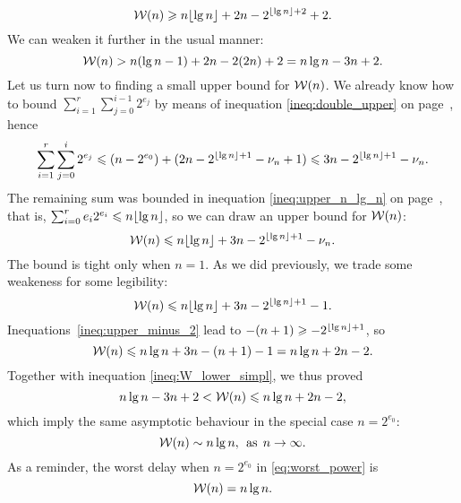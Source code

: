 \begin{equation}
\mathcal{W}(n) \geqslant n\lfloor{\lg n}\rfloor + 2n - 2^{\lfloor{\lg n}\rfloor+2} + 2.
\label{ineq:W_lower}
\end{equation}
We can weaken it further in the usual manner:
\begin{equation}
\mathcal{W}(n) > n(\lg n - 1) + 2n - 2(2n) + 2 = n\lg n - 3n + 2.
\label{ineq:W_lower_simpl}
\end{equation}
Let us turn now to finding a small upper bound for \(\mathcal{W}(n)\).  We
already know how to bound \(\sum_{i=1}^{r}\sum_{j=0}^{i-1}{2^{e_j}}\)
by means of inequation \eqref{ineq:double_upper}
on page~\pageref{ineq:double_upper}, hence
\begin{equation*}
\sum_{i=1}^{r}\sum_{j=0}^{i}{2^{e_j}}
\leqslant (n - 2^{e_0})
           + (2n - 2^{\lfloor{\lg n}\rfloor + 1} - \nu_{n} + 1)
\leqslant 3n - 2^{\lfloor{\lg n}\rfloor+1} - \nu_{n}.
\end{equation*}
The remaining sum was bounded in inequation \eqref{ineq:upper_n_lg_n}
on page~\pageref{ineq:upper_n_lg_n}, that is,
\(\sum_{i=0}^{r}{e_i2^{e_i}} \leqslant n \lfloor{\lg n}\rfloor\), so we can
draw an upper bound for \(\mathcal{W}(n)\):
\begin{equation*}
\mathcal{W}(n) \leqslant 
n\lfloor{\lg n}\rfloor + 3n - 2^{\lfloor{\lg n}\rfloor+1} - \nu_{n}.
\end{equation*}
The bound is tight only when \(n=1\). As we did previously, we trade
some weakeness for some legibility:
\begin{equation}
\mathcal{W}(n) \leqslant n\lfloor{\lg n}\rfloor + 3n - 2^{\lfloor{\lg n}\rfloor+1} - 1.
\label{ineq:W_upper}
\end{equation}
Inequations~\eqref{ineq:upper_minus_2} 
lead to \(-(n+1) \geqslant -2^{\lfloor{\lg n}\rfloor+1}\), so
\begin{equation}
\mathcal{W}(n) \leqslant n \lg n + 3n - (n+1) - 1
= n \lg n + 2n - 2.
\label{ineq:W_upper_simpl}
\end{equation}
Together with inequation \eqref{ineq:W_lower_simpl}, we thus proved
\begin{equation*}
n\lg n - 3n + 2 < \mathcal{W}(n) \leqslant n \lg n + 2n - 2,
\end{equation*}
which imply the same asymptotic behaviour in the special case
\(n=2^{e_0}\):
\[
\mathcal{W}(n) \mathrel{\sim} n\lg n,\;\, \text{as} \,\; n \rightarrow
\infty.
\]
As a reminder, the worst delay when \(n=2^{e_0}\) in
\eqref{eq:worst_power}  is
\[
\mathcal{W}(n) = n\lg n.
\]

\medskip

